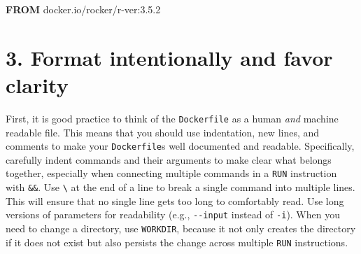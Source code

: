 \documentclass[10pt,letterpaper]{article}
\newenvironment{Shaded}{\begin{snugshade}}{\end{snugshade}}
\newcommand{\KeywordTok}[1]{\textcolor[rgb]{0.13,0.29,0.53}{\textbf{#1}}}
\newcommand{\NormalTok}[1]{#1}
\begin{document}
\footnotesize

\begin{Shaded}
\begin{Highlighting}[]
\KeywordTok{FROM}\NormalTok{ docker.io/rocker/r-ver:3.5.2}
\end{Highlighting}
\end{Shaded}

\normalsize

\hypertarget{format-intentionally-and-favor-clarity}{%
\section{3. Format intentionally and favor
clarity}\label{format-intentionally-and-favor-clarity}}

  \label{rule:formatting} 
  \label{rule:clarity} 

First, it is good practice to think of the \texttt{Dockerfile} as a
human \emph{and} machine readable file. This means that you should use
indentation, new lines, and comments to make your \texttt{Dockerfile}s
well documented and readable. Specifically, carefully indent commands
and their arguments to make clear what belongs together, especially when
connecting multiple commands in a \texttt{RUN} instruction with
\texttt{\&\&}. Use \texttt{\textbackslash{}} at the end of a line to
break a single command into multiple lines. This will ensure that no
single line gets too long to comfortably read. Use long versions of
parameters for readability (e.g., \texttt{-\/-input} instead of
\texttt{-i}). When you need to change a directory, use \texttt{WORKDIR},
because it not only creates the directory if it does not exist but also
persists the change across multiple \texttt{RUN} instructions.
\end{document}
